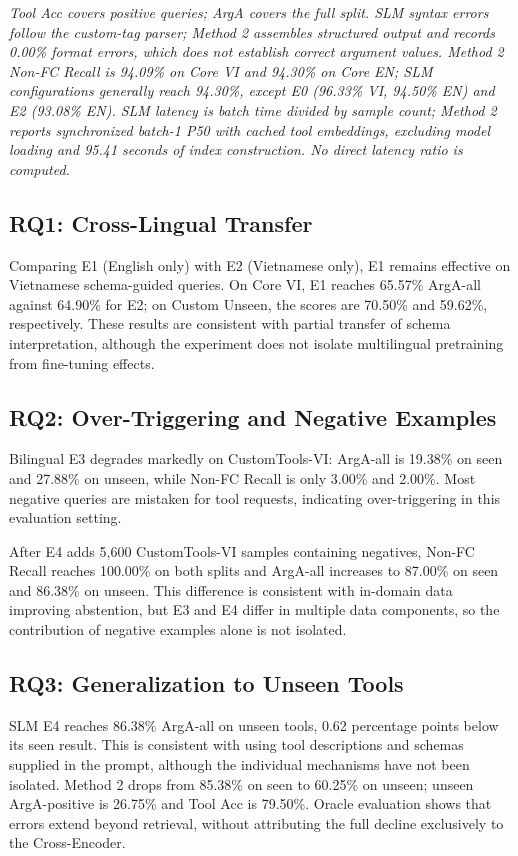 \documentclass[10pt,twocolumn,a4paper]{article}
\begin{document}
\textit{Tool Acc covers positive queries; ArgA covers the full split. SLM syntax errors follow the custom-tag parser; Method 2 assembles structured output and records 0.00\% format errors, which does not establish correct argument values. Method 2 Non-FC Recall is 94.09\% on Core VI and 94.30\% on Core EN; SLM configurations generally reach 94.30\%, except E0 (96.33\% VI, 94.50\% EN) and E2 (93.08\% EN). SLM latency is batch time divided by sample count; Method 2 reports synchronized batch-1 P50 with cached tool embeddings, excluding model loading and 95.41 seconds of index construction. No direct latency ratio is computed.}

\subsection{RQ1: Cross-Lingual Transfer}
Comparing E1 (English only) with E2 (Vietnamese only), E1 remains effective on Vietnamese schema-guided queries. On Core VI, E1 reaches 65.57\% ArgA-all against 64.90\% for E2; on Custom Unseen, the scores are 70.50\% and 59.62\%, respectively. These results are consistent with partial transfer of schema interpretation, although the experiment does not isolate multilingual pretraining from fine-tuning effects.

\subsection{RQ2: Over-Triggering and Negative Examples}
Bilingual E3 degrades markedly on CustomTools-VI: ArgA-all is 19.38\% on seen and 27.88\% on unseen, while Non-FC Recall is only 3.00\% and 2.00\%. Most negative queries are mistaken for tool requests, indicating over-triggering in this evaluation setting.

After E4 adds 5,600 CustomTools-VI samples containing negatives, Non-FC Recall reaches 100.00\% on both splits and ArgA-all increases to 87.00\% on seen and 86.38\% on unseen. This difference is consistent with in-domain data improving abstention, but E3 and E4 differ in multiple data components, so the contribution of negative examples alone is not isolated.

\subsection{RQ3: Generalization to Unseen Tools}
SLM E4 reaches 86.38\% ArgA-all on unseen tools, 0.62 percentage points below its seen result. This is consistent with using tool descriptions and schemas supplied in the prompt, although the individual mechanisms have not been isolated. Method 2 drops from 85.38\% on seen to 60.25\% on unseen; unseen ArgA-positive is 26.75\% and Tool Acc is 79.50\%. Oracle evaluation shows that errors extend beyond retrieval, without attributing the full decline exclusively to the Cross-Encoder.
\end{document}
